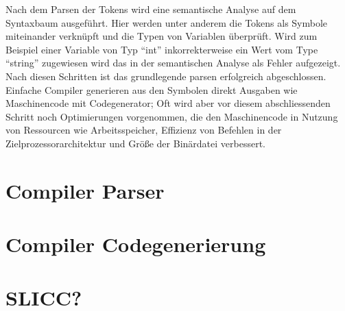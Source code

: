 Nach dem Parsen der Tokens wird eine semantische Analyse auf dem Syntaxbaum ausgeführt. 
Hier werden unter anderem die Tokens als Symbole miteinander verknüpft und die Typen von Variablen überprüft.
Wird zum Beispiel einer Variable von Typ ``int'' inkorrekterweise ein Wert vom Type ``string'' zugewiesen wird das in der semantischen Analyse als Fehler aufgezeigt.
Nach diesen Schritten ist das grundlegende parsen erfolgreich abgeschlossen.\\
Einfache Compiler generieren aus den Symbolen direkt Ausgaben wie Maschinencode mit Codegenerator;
Oft wird aber vor diesem abschliessenden Schritt noch Optimierungen vorgenommen, die den Maschinencode in Nutzung von Ressourcen wie Arbeitsspeicher, Effizienz von Befehlen in der Zielprozessorarchitektur und Größe der Binärdatei verbessert.\\

\section{Compiler Parser}

\section{Compiler Codegenerierung}

\section{SLICC?}

